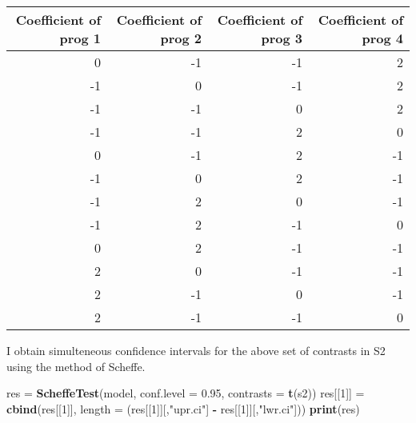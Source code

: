 \documentclass[]{article}
\newenvironment{Shaded}{\begin{snugshade}}{\end{snugshade}}
\newcommand{\KeywordTok}[1]{\textcolor[rgb]{0.13,0.29,0.53}{\textbf{#1}}}
\newcommand{\DataTypeTok}[1]{\textcolor[rgb]{0.13,0.29,0.53}{#1}}
\newcommand{\DecValTok}[1]{\textcolor[rgb]{0.00,0.00,0.81}{#1}}
\newcommand{\FloatTok}[1]{\textcolor[rgb]{0.00,0.00,0.81}{#1}}
\newcommand{\StringTok}[1]{\textcolor[rgb]{0.31,0.60,0.02}{#1}}
\newcommand{\OperatorTok}[1]{\textcolor[rgb]{0.81,0.36,0.00}{\textbf{#1}}}
\newcommand{\NormalTok}[1]{#1}
\begin{document}
\begin{table}[H]
\centering
\begin{tabular}{r|r|r|r}
\hline
Coefficient of prog 1 & Coefficient of prog 2 & Coefficient of prog 3 & Coefficient of prog 4\\
\hline
0 & -1 & -1 & 2\\
\hline
-1 & 0 & -1 & 2\\
\hline
-1 & -1 & 0 & 2\\
\hline
-1 & -1 & 2 & 0\\
\hline
0 & -1 & 2 & -1\\
\hline
-1 & 0 & 2 & -1\\
\hline
-1 & 2 & 0 & -1\\
\hline
-1 & 2 & -1 & 0\\
\hline
0 & 2 & -1 & -1\\
\hline
2 & 0 & -1 & -1\\
\hline
2 & -1 & 0 & -1\\
\hline
2 & -1 & -1 & 0\\
\hline
\end{tabular}
\end{table}

I obtain simulteneous confidence intervals for the above set of
contrasts in S2 using the method of Scheffe.

\begin{Shaded}
\begin{Highlighting}[]
\NormalTok{res =}\StringTok{ }\KeywordTok{ScheffeTest}\NormalTok{(model, }\DataTypeTok{conf.level =} \FloatTok{0.95}\NormalTok{, }\DataTypeTok{contrasts =} \KeywordTok{t}\NormalTok{(s2))}
\NormalTok{res[[}\DecValTok{1}\NormalTok{]] =}\StringTok{ }\KeywordTok{cbind}\NormalTok{(res[[}\DecValTok{1}\NormalTok{]], }\DataTypeTok{length =}\NormalTok{ (res[[}\DecValTok{1}\NormalTok{]][,}\StringTok{"upr.ci"}\NormalTok{] }\OperatorTok{-}\StringTok{ }\NormalTok{res[[}\DecValTok{1}\NormalTok{]][,}\StringTok{"lwr.ci"}\NormalTok{]))}
\KeywordTok{print}\NormalTok{(res)}
\end{Highlighting}
\end{Shaded}
\end{document}
